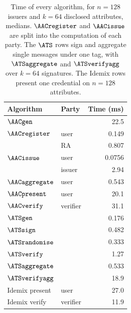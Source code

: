 \begin{table}[htbp] \centering
  \begin{tabular}{l l r}
    \toprule
    Algorithm & Party & Time (ms) \\
    \midrule
    $\AACgen$ & & 22.5 \\
    $\AACregister$ & user & 0.149 \\
                   & RA & 0.807 \\
    $\AACissue$ & user & 0.0756 \\
                & issuer & 2.94 \\
    $\AACaggregate$ & user & 0.543 \\
    $\AACpresent$ & user & 20.1 \\
    $\AACverify$ & verifier & 31.1 \\
    \midrule
    $\ATSgen$ & & 0.176 \\
    $\ATSsign$ & & 0.482 \\
    $\ATSrandomise$ & & 0.333 \\
    $\ATSverify$ & & 1.27 \\
    $\ATSaggregate$ & & 0.533 \\
    $\ATSverifyagg$ & & 18.9 \\
    \midrule
    Idemix present & user & 27.0 \\
    Idemix verify & verifier & 11.9 \\
    \bottomrule
  \end{tabular}
  \caption[Aggregate credentials: time of every algorithm]{Time of every
algorithm, for $n = 128$ issuers and $k = 64$ disclosed attributes, medians.
$\AACregister$ and $\AACissue$ are split into the computation of each party. The
$\ATS$ rows sign and aggregate single messages under one tag, with
$\ATSaggregate$ and $\ATSverifyagg$ over $k = 64$ signatures. The Idemix rows
present one credential on $n = 128$ attributes.}
  \label{tab:agg-creds-times}
\end{table}

